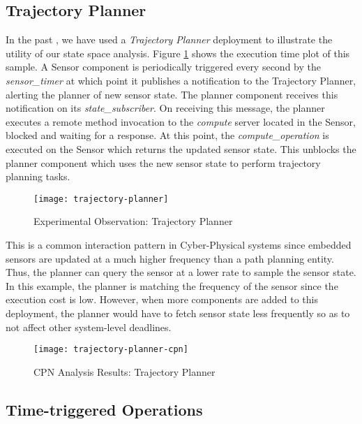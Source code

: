 \subsection{Trajectory Planner}

In the past \cite{kumar2014colored}, we have used a \emph{Trajectory Planner} deployment to illustrate the utility of our state space analysis. Figure \ref{fig:trajectory-planner} shows the execution time plot of this sample. A Sensor component is periodically triggered every second by the \emph{sensor\_timer} at which point it publishes a notification to the Trajectory Planner, alerting the planner of new sensor state. The planner component receives this notification on its \emph{state\_subscriber}. On receiving this message, the planner executes a remote method invocation to the \emph{compute} server located in the Sensor, blocked and waiting for a response. At this point, the \emph{compute\_operation} is executed on the Sensor which returns the updated sensor state. This unblocks the planner component which uses the new sensor state to perform trajectory planning tasks. 

\begin{figure}[h]
	\centering
	\texttt{[image: trajectory-planner]}
	\caption{Experimental Observation: Trajectory Planner}
	\label{fig:trajectory-planner}
\end{figure}
\FloatBarrier

This is a common interaction pattern in Cyber-Physical systems since embedded sensors are updated at a much higher frequency than a path planning entity. Thus, the planner can query the sensor at a lower rate to sample the sensor state. In this example, the planner is matching the frequency of the sensor since the execution cost is low. However, when more components are added to this deployment, the planner would have to fetch sensor state less frequently so as to not affect other system-level deadlines.  

\begin{figure}[h]
	\centering
	\texttt{[image: trajectory-planner-cpn]}
	\caption{CPN Analysis Results: Trajectory Planner}
	\label{fig:trajectory-planner-cpn}
\end{figure}
\FloatBarrier

\subsection{Time-triggered Operations}


